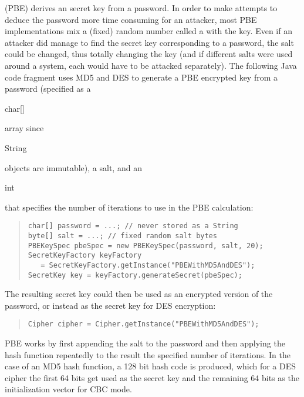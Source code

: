  (PBE) derives an secret key from a password.
In order to make attempts to deduce the password more time
consuming for an attacker, most PBE implementations mix a (fixed)
random number called a  with the key. Even if an
attacker did manage to find the secret key corresponding to a
password, the salt could be changed, thus totally changing the key
(and if different salts were used around a system, each would have
to be attacked separately). The following Java code fragment uses
MD5 and DES to generate a PBE encrypted key from a password
(specified as a \begin{code}char[]\end{code} array since
\begin{code}String\end{code} objects are immutable), a salt, and
an \begin{code}int\end{code} that specifies the number of
iterations to use in the PBE calculation:
\begin{quote}\begin{code}\begin{verbatim}
char[] password = ...; // never stored as a String
byte[] salt = ...; // fixed random salt bytes
PBEKeySpec pbeSpec = new PBEKeySpec(password, salt, 20);
SecretKeyFactory keyFactory
   = SecretKeyFactory.getInstance("PBEWithMD5AndDES");
SecretKey key = keyFactory.generateSecret(pbeSpec);
\end{verbatim}\end{code}\end{quote}
The resulting secret key could then be used as an encrypted
version of the password, or instead as the secret key for DES
encryption:
\begin{quote}\begin{code}\begin{verbatim}
Cipher cipher = Cipher.getInstance("PBEWithMD5AndDES");
\end{verbatim}\end{code}\end{quote}
PBE works by first appending the salt to the password and then
applying the hash function repeatedly to the result the specified
number of iterations. In the case of an MD5 hash function, a 128
bit hash code is produced, which for a DES cipher the first 64
bits get used as the secret key and the remaining 64 bits as the
initialization vector for CBC mode.

